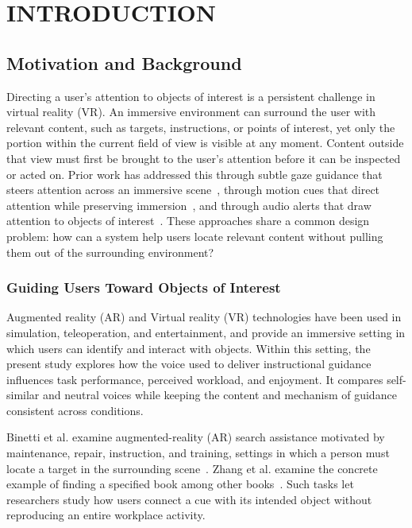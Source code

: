 \chapter{INTRODUCTION}
\label{ch:introduction}
\section{Motivation and Background}
Directing a user's attention to objects of interest is a persistent challenge in virtual reality (VR). An immersive environment can surround the user with relevant content, such as targets, instructions, or points of interest, yet only the portion within the current field of view is visible at any moment. Content outside that view must first be brought to the user's attention before it can be inspected or acted on. Prior work has addressed this through subtle gaze guidance that steers attention across an immersive scene~\cite{grogorick2017subtle}, through motion cues that direct attention while preserving immersion~\cite{lange2020hivefive}, and through audio alerts that draw attention to objects of interest~\cite{sabouni2025guidance}. These approaches share a common design problem: how can a system help users locate relevant content without pulling them out of the surrounding environment?

\subsection{Guiding Users Toward Objects of Interest}
Augmented reality (AR) and Virtual reality (VR) technologies have been used in simulation, teleoperation, and entertainment, and provide an immersive setting in which users can identify and interact with objects. Within this setting, the present study explores how the voice used to deliver instructional guidance influences task performance, perceived workload, and enjoyment. It compares self-similar and neutral voices while keeping the content and mechanism of guidance consistent across conditions.

Binetti et al. examine augmented-reality (AR) search assistance motivated by maintenance, repair, instruction, and training, settings in which a person must locate a target in the surrounding scene~\cite{binetti2021outofview}. Zhang et al. examine the concrete example of finding a specified book among other books~\cite{zhang2023seehear}. Such tasks let researchers study how users connect a cue with its intended object without reproducing an entire workplace activity.

